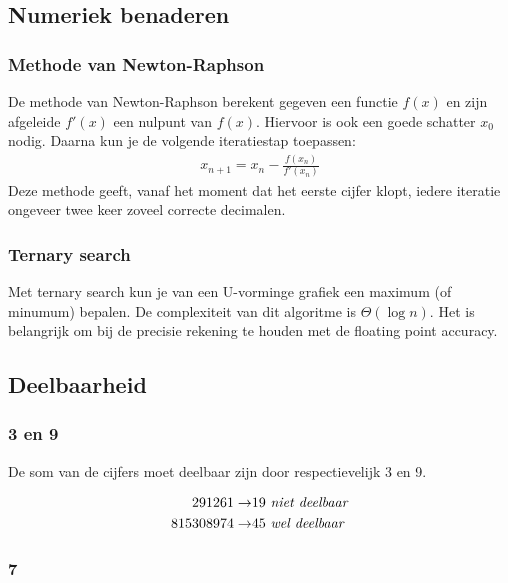 \documentclass[10pt,hidelinks]{article}
\begin{document}
\subsection{Numeriek benaderen}

\subsubsection{Methode van Newton-Raphson}

De methode van Newton-Raphson berekent gegeven een functie $f(x)$ en zijn afgeleide $f'(x)$ een nulpunt van $f(x)$. Hiervoor is ook een goede schatter $x_0$ nodig. Daarna kun je de volgende iteratiestap toepassen:
\begin{align*}
    x_{n+1} = x_{n} - \frac{f(x_{n})}{f'(x_{n})}
\end{align*}
Deze methode geeft, vanaf het moment dat het eerste cijfer klopt, iedere iteratie ongeveer twee keer zoveel correcte decimalen.

\subsubsection{Ternary search}

Met ternary search kun je van een U-vorminge grafiek een maximum (of minumum) bepalen. De complexiteit van dit algoritme is $\Theta(\log n)$. Het is belangrijk om bij de precisie rekening te houden met de floating point accuracy.



\subsection{Deelbaarheid}

\subsubsection{3 en 9}

De som van de cijfers moet deelbaar zijn door respectievelijk 3 en 9.

\begin{align*}
	291261 \to & 19 \text{ \emph{niet deelbaar}} \\
	815308974 \to & 45 \text{ \emph{wel deelbaar}}
\end{align*}

\subsubsection{7}
\end{document}
